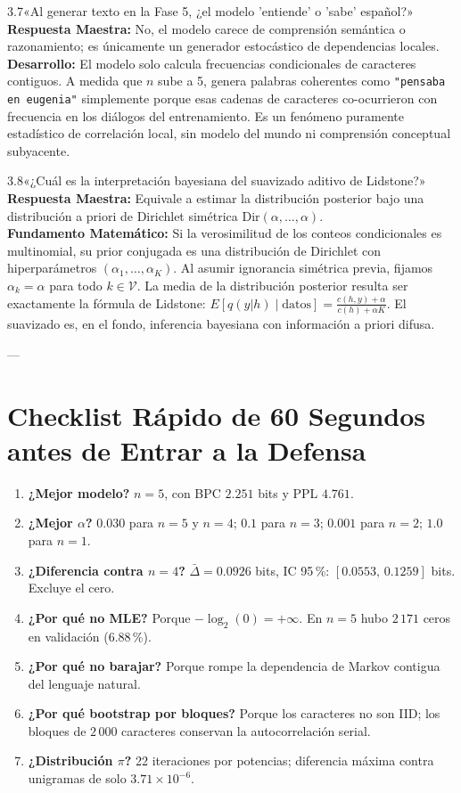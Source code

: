 \documentclass[11pt,letterpaper]{article}
\begin{document}
\begin{trapbox}{3.7}{«Al generar texto en la Fase 5, ¿el modelo 'entiende' o 'sabe' español?»}
\textbf{Respuesta Maestra:} No, el modelo carece de comprensión semántica o razonamiento; es únicamente un generador estocástico de dependencias locales.\\[3pt]
\textbf{Desarrollo:} El modelo solo calcula frecuencias condicionales de caracteres contiguos. A medida que $n$ sube a 5, genera palabras coherentes como \texttt{"pensaba en eugenia"} simplemente porque esas cadenas de caracteres co-ocurrieron con frecuencia en los diálogos del entrenamiento. Es un fenómeno puramente estadístico de correlación local, sin modelo del mundo ni comprensión conceptual subyacente.
\end{trapbox}

\begin{trapbox}{3.8}{«¿Cuál es la interpretación bayesiana del suavizado aditivo de Lidstone?»}
\textbf{Respuesta Maestra:} Equivale a estimar la distribución posterior bajo una distribución a priori de Dirichlet simétrica $\text{Dir}(\alpha, \ldots, \alpha)$.\\[3pt]
\textbf{Fundamento Matemático:} Si la verosimilitud de los conteos condicionales es multinomial, su prior conjugada es una distribución de Dirichlet con hiperparámetros $(\alpha_1, \ldots, \alpha_K)$. Al asumir ignorancia simétrica previa, fijamos $\alpha_k = \alpha$ para todo $k \in \mathcal{V}$. La media de la distribución posterior resulta ser exactamente la fórmula de Lidstone: $E[q(y|h) \mid \text{datos}] = \frac{c(h,y) + \alpha}{c(h) + \alpha K}$. El suavizado es, en el fondo, inferencia bayesiana con información a priori difusa.
\end{trapbox}

---

\section*{Checklist Rápido de 60 Segundos antes de Entrar a la Defensa}
\begin{enumerate}[leftmargin=*, nosep]
    \item \textbf{¿Mejor modelo?} $n=5$, con BPC $2.251$ bits y PPL $4.761$.
    \item \textbf{¿Mejor $\alpha$?} $0.030$ para $n=5$ y $n=4$; $0.1$ para $n=3$; $0.001$ para $n=2$; $1.0$ para $n=1$.
    \item \textbf{¿Diferencia contra $n=4$?} $\bar{\Delta} = 0.0926$ bits, IC 95\,\%: $[0.0553,\, 0.1259]$ bits. Excluye el cero.
    \item \textbf{¿Por qué no MLE?} Porque $-\log_2(0) = +\infty$. En $n=5$ hubo $2\,171$ ceros en validación (6.88\,\%).
    \item \textbf{¿Por qué no barajar?} Porque rompe la dependencia de Markov contigua del lenguaje natural.
    \item \textbf{¿Por qué bootstrap por bloques?} Porque los caracteres no son IID; los bloques de $2\,000$ caracteres conservan la autocorrelación serial.
    \item \textbf{¿Distribución $\pi$?} 22 iteraciones por potencias; diferencia máxima contra unigramas de solo $3.71 \times 10^{-6}$.
\end{enumerate}
\end{document}
